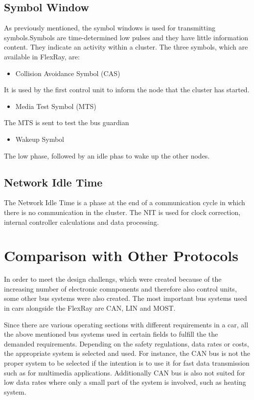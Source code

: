 \documentclass[conference]{IEEEtran}
\begin{document}
\subsection{Symbol Window}
As previously mentioned, the symbol windows is used for transmitting symbols.Symbols  are time-determined low pulses and they have little information content. They indicate an activity within a cluster. The three symbols, which are available in FlexRay, are:

\begin{itemize}
  \item Collision Avoidance Symbol (CAS)
\end{itemize}
It is used by the first control unit to inform the node that the cluster has started.

\begin{itemize}
  \item Media Test Symbol (MTS)
\end{itemize}
The MTS is sent to test the bus guardian

\begin{itemize}
  \item Wakeup Symbol
\end{itemize}
The low phase, followed by an idle phas to wake up the other nodes.

\subsection{Network Idle Time}
The Network Idle Time is a phase at the end of a communication cycle in which there is no communication in the cluster. The NIT is used for clock correction, internal controller calculations and data processing.

\section*{Comparison with Other Protocols}

In order to meet the design challengs, which were created because of the increasing number of electronic comnponents and therefore also control units, some other bus systems were also created. The most important bus systems used in cars alongside the FlexRay are CAN, LIN and MOST.

Since there are various operating sections with different requirements in a car, all the above mentioned  bus systems used in certain fields to fulfill the the demanded requirements. Depending on the safety regulations, data rates or costs, the appropriate system is selected and used. For instance, the CAN bus is not the proper system to be selected if the intention is to use it for fast data transmission such as for multimedia applications. Additionally CAN bus is also not suited for low data rates where only a small part of the system is involved, such as heating system.
\end{document}
